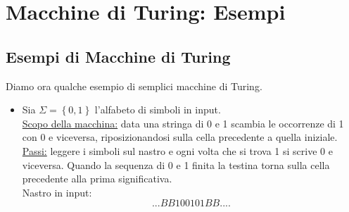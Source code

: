 \chapter{Macchine di Turing: Esempi}


\section{Esempi di Macchine di Turing}
Diamo ora qualche esempio di semplici macchine di Turing.\\

\begin{itemize}
\item Sia $\Sigma=\left\{0,1\right\}$ l'alfabeto di simboli in
  input. \\\underline{Scopo della macchina:} data una stringa di 0 e 1
  scambia le occorrenze di 1 con 0 e viceversa, riposizionandosi sulla
  cella precedente a quella iniziale.\\ \underline{Passi:} leggere i
  simboli sul nastro e ogni volta che si trova 1 si scrive 0 e
  viceversa. Quando la sequenza di 0 e 1  finita la testina torna
  sulla cella precedente alla prima significativa.\\

Nastro in input:$$...BB100101BB....$$\\


\end{itemize}

